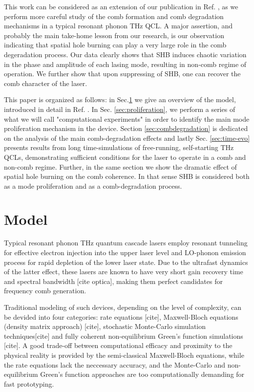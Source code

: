 \documentclass[journal]{IEEEtran}
\begin{document}
This work can be considered as an extension of our publication in Ref. \cite{petz2016}, as we perform more careful study of the comb formation and comb degradation mechanisms in a typical resonant phonon THz QCL. A major assertion, and probably the main take-home lesson from our research, is our observation indicating that spatial hole burning can play a very large role in the comb degeradation process. Our data clearly shows that SHB induces chaotic variation in the phase and amplitude of each lasing mode, resulting in non-comb regime of operation. We further show that upon suppressing of SHB, one can recover the comb character of the laser.  

This paper is organized as follows: in Sec.\ref{sec:theory} we give an overview of the model, introduced in detail in Ref. \cite{petz2016}. In Sec. \ref{sec:proliferation}, we perform a series of what we will call "computational experiments" in order to identify the main mode proliferation mechanism in the device. Section \ref{sec:combdegradation} is dedicated on the analysis of the main comb-degradation effects and lastly Sec. \ref{sec:time-evo} presents results from long time-simulations of free-running, self-starting THz QCLs, demonstrating sufficient conditions for the laser to operate in a comb and non-comb regime. Further, in the same section we show the dramatic effect of spatial hole burning on the comb coherence. In that sense SHB is considered both as a mode proliferation and as a comb-degradation process.

\section{Model}
\label{sec:theory}
Typical resonant phonon THz quantum cascade lasers employ resonant tunneling for effective electron injection into the upper laser level and LO-phonon emission process for rapid depletion of the lower laser state. Due to the ultrafast dynamics of the latter effect, these lasers are known to have very short gain recovery time and spectral bandwidth [cite optica], making them perfect candidates for frequency comb generation. 

Traditional modeling of such devices, depending on the level of complexity, can be devided into four categories: rate equations [cite], Maxwell-Bloch equations (density matrix approach) [cite], stochastic Monte-Carlo simulation techniques[cite] and fully coherent non-equilibrium Green's function simulations [cite]. A good trade-off between computational efficacy and proximity to the physical reality is provided by the semi-classical Maxwell-Bloch equations, while the rate equations lack the neccessary accuracy, and the Monte-Carlo and non-equilibrium Green's function approaches are too computationally demanding for fast prototyping.
\end{document}
